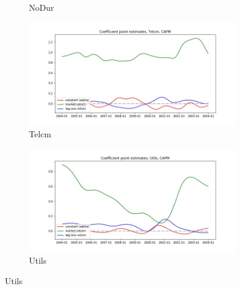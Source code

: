 \documentclass{article}
\begin{document}
\begin{figure}
\begin{subfigure}[b]{0.5\textwidth}
    \caption{NoDur}
    \label{fig:2}
  \end{subfigure}
  \begin{subfigure}[b]{0.5\textwidth}
    \centering
    \includegraphics[width=\textwidth]{Telcm/coeffs_CAPM.jpg}
    \caption{Telcm}
    \label{fig:2}
  \end{subfigure}
  \begin{subfigure}[b]{0.5\textwidth}
    \centering
    \includegraphics[width=\textwidth]{Utils/coeffs_CAPM.jpg}
    \caption{Utils}
    \label{fig:2}
  \end{subfigure}
\end{figure}

\newpage
\end{document}
